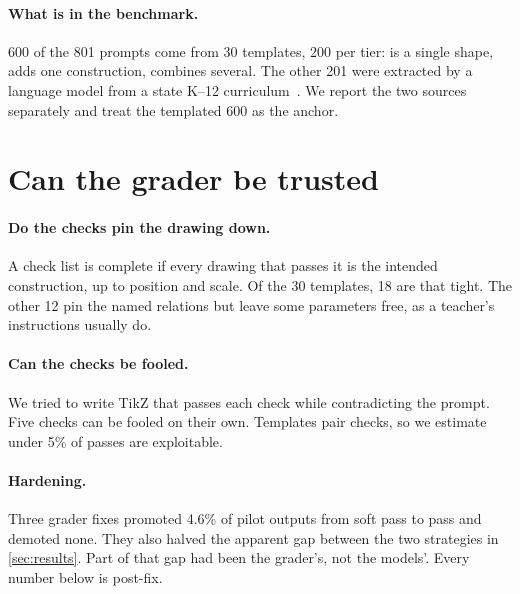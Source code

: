 \documentclass{article}
\begin{document}
\paragraph{What is in the benchmark.}
600 of the 801 prompts come from 30 templates, 200 per tier: \textbf{\tone} is a single shape, \textbf{\ttwo} adds one construction, \textbf{\tthree} combines several.
The other 201 were extracted by a language model from a state K--12 curriculum~\citep{bluebonnet2024}.
We report the two sources separately and treat the templated 600 as the anchor.

\section{Can the grader be trusted}
\label{sec:verification}

\paragraph{Do the checks pin the drawing down.}
A check list is complete if every drawing that passes it is the intended construction, up to position and scale.
Of the 30 templates, 18 are that tight.
The other 12 pin the named relations but leave some parameters free, as a teacher's instructions usually do.

\paragraph{Can the checks be fooled.}
We tried to write TikZ that passes each check while contradicting the prompt.
Five checks can be fooled on their own.
Templates pair checks, so we estimate under 5\% of passes are exploitable.

\paragraph{Hardening.}
Three grader fixes promoted 4.6\% of pilot outputs from soft pass to pass and demoted none.
They also halved the apparent gap between the two strategies in \cref{sec:results}.
Part of that gap had been the grader's, not the models'.
Every number below is post-fix.
\end{document}
